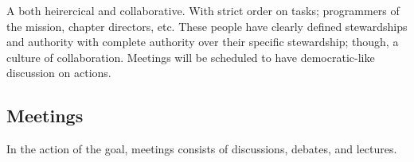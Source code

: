 A both heirercical and collaborative. With strict order on tasks; programmers of the mission, chapter directors, etc. These people have clearly defined stewardships and authority with complete authority over their specific stewardship; though, a culture of collaboration. Meetings will be scheduled to have democratic-like discussion on actions.

\subsection{Meetings}

In the action of the goal, meetings consists of discussions, debates, and lectures.
